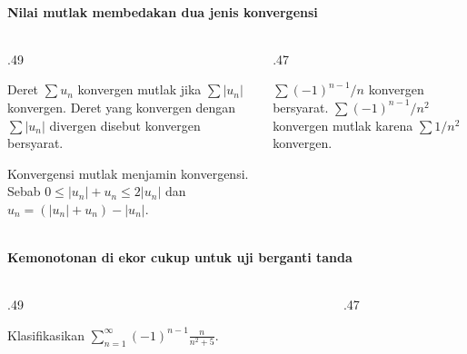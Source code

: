 \documentclass{../../kalkulus-ppt}
\begin{document}
\begin{frame}{\insertsection}
    \framesubtitle{Nilai mutlak membedakan dua jenis konvergensi}
    \begin{columns}[T,onlytextwidth]
        \begin{column}{.49\textwidth}
            \begin{definisi}
                Deret $\sum u_n$ konvergen mutlak jika
                $\sum |u_n|$ konvergen. Deret yang konvergen
                dengan $\sum|u_n|$ divergen disebut konvergen bersyarat.
            \end{definisi}
            Konvergensi mutlak menjamin konvergensi.
            Sebab $0\le |u_n|+u_n\le2|u_n|$ dan
            $u_n=(|u_n|+u_n)-|u_n|$.
        \end{column}
        \begin{column}{.47\textwidth}
            \begin{contoh}
                $\sum(-1)^{n-1}/n$ konvergen bersyarat.
                $\sum(-1)^{n-1}/n^2$ konvergen mutlak
                karena $\sum 1/n^2$ konvergen.
            \end{contoh}
        \end{column}
    \end{columns}
\end{frame}

\begin{frame}{\insertsection}
    \framesubtitle{Kemonotonan di ekor cukup untuk uji berganti tanda}
    \begin{columns}[T,onlytextwidth]
        \begin{column}{.49\textwidth}
            \begin{contoh}
                Klasifikasikan
                $\displaystyle\sum_{n=1}^\infty(-1)^{n-1}
                \frac{n}{n^2+5}$.
            \end{contoh}
        \end{column}
        \begin{column}{.47\textwidth}
        \end{column}
    \end{columns}
\end{frame}
\end{document}
